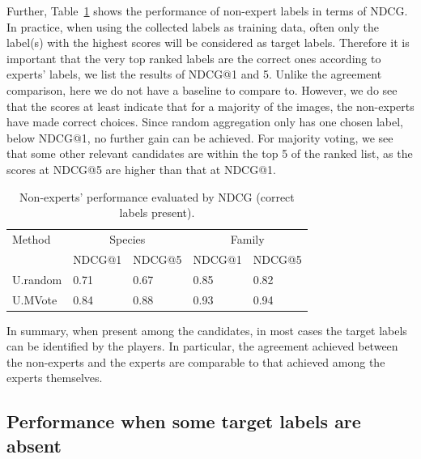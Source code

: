 Further, Table~\ref{tab:ndcg} shows the performance of non-expert labels in terms of NDCG. 
%
In practice, when using the collected labels as training data, often only the label(s) with 
the highest scores will be considered as target labels. 
%
Therefore it is important that the very top ranked labels are the correct ones according
to experts' labels, we list the results of NDCG@1 and 5.  
Unlike the agreement comparison, here we do not 
have a baseline to compare to.  However, we do see that the scores at least
indicate that for a majority of the images, the non-experts have made correct choices. 
Since random aggregation only has one chosen label, below NDCG@1, 
no further gain can be achieved. For majority voting, we see that some other
relevant candidates are within the top 5 of the ranked list, as the
scores at NDCG@5 are higher than that at NDCG@1. 
%
\begin{table}[h!]
\centering
\begin{tabular}{@{}l@{~~}l@{~~}l@{~~}l@{~~}l@{}}
\hline
 Method & \multicolumn{2}{c}{Species} & \multicolumn{2}{c}{Family}\\
 & NDCG@1 & NDCG@5  & NDCG@1 & NDCG@5\\ 
 \hline
 U.random & 0.71 & 0.67 & 0.85 & 0.82\\
 U.MVote & 0.84 & 0.88 & 0.93 & 0.94\\
\hline
\end{tabular}
\caption{Non-experts' performance evaluated by NDCG (correct labels present).}
\label{tab:ndcg}
\end{table}
%

In summary, when present among the candidates, in most cases the target labels 
can be identified by the players.
%
In particular, the agreement achieved between the non-experts and the experts
are comparable to that achieved among the experts themselves. 

\subsection{Performance when some target labels are absent}

